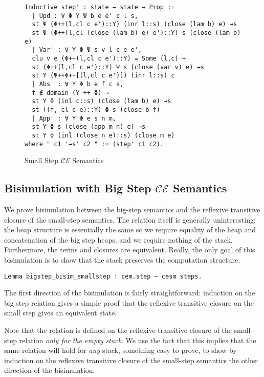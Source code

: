 \begin{figure}
\begin{lstlisting}
Inductive step' : state → state → Prop :=
  | Upd : ∀ Φ Υ Ψ b e e' c l s, 
  st Ψ (Φ++(l,cl c e')::Υ) (inr l::s) (close (lam b) e) →s 
  st Ψ (Φ++(l,cl (close (lam b) e) e')::Υ) s (close (lam b) e)
  | Var' : ∀ Υ Φ Ψ s v l c e e', 
  clu v e (Φ++(l,cl c e')::Υ) = Some (l,c) → 
  st (Φ++(l,cl c e')::Υ) Ψ s (close (var v) e) →s 
  st Υ (Ψ++Φ++[(l,cl c e')]) (inr l::s) c
  | Abs' : ∀ Υ Φ b e f c s, 
  f ∉ domain (Υ ++ Φ) → 
  st Υ Φ (inl c::s) (close (lam b) e) →s 
  st ((f, cl c e)::Υ) Φ s (close b f)
  | App' : ∀ Υ Φ e s n m, 
  st Υ Φ s (close (app m n) e) →s 
  st Υ Φ (inl (close n e)::s) (close m e)
where " c1 '→s' c2 " := (step' c1 c2).
\end{lstlisting}
\caption{Small Step $\mathcal{CE}$ Semantics}
\end{figure}

\subsection{Bisimulation with Big Step $\mathcal{CE}$ Semantics}

We prove bisimulation between the big-step semantics and the reflexive
transitive closure of the small-step semantics. The relation itself is generally
uninteresting; the heap structure is essentially the same so we require equality
of the heap and concatenation of the big step heaps, and we require nothing of
the stack. Furthermore, the terms and closures are equivalent. Really, the only
goal of this bisimulation is to show that the stack preserves the computation
structure.  

\begin{lstlisting}
Lemma bigstep_bisim_smallstep : cem.step ~ cesm steps. 
\end{lstlisting}

The first direction of the bisimulation is fairly straightforward: induction on
the big step relation gives a simple proof that the reflexive transitive closure
on the small step gives an equivalent state. 

Note that the relation is defined on the reflexive transitive closure of the
small-step relation \emph{only for the empty stack}. We use the fact that this
implies that the same relation will hold for \emph{any} stack, something easy to
prove, to show by induction on the reflexive transitive closure of the
small-step semantics the other direction of the bisimulation. 

